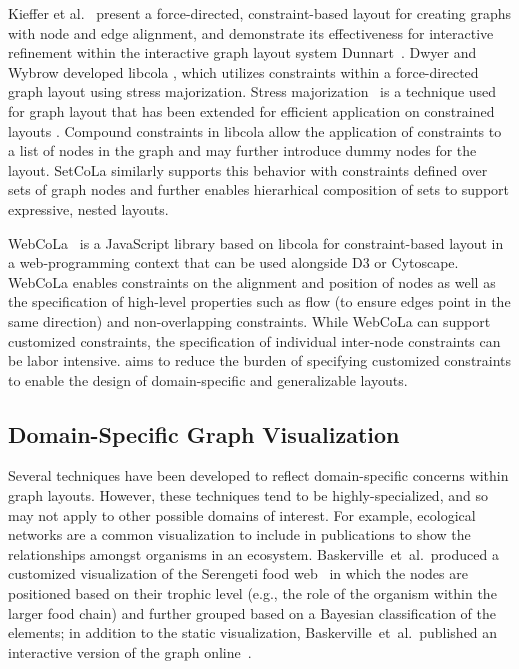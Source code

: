 Kieffer et al.~\cite{kieffer2013incremental} present a force-directed,
constraint-based layout for creating graphs with node and edge alignment, 
and demonstrate its effectiveness for interactive refinement within
the interactive graph layout system Dunnart~\cite{dwyer2008dunnart}.
Dwyer and Wybrow developed libcola \cite{libcola}, which utilizes constraints within a
force-directed graph layout \cite{dwyer2008topology} using 
stress majorization. Stress majorization~\cite{gansner2004graph} 
is a technique used for graph layout that has been extended for efficient 
application on constrained layouts \cite{dwyer2007constrained,wang2018revisiting}.
Compound constraints in libcola allow the application of constraints to a list
of nodes in the graph and may further introduce dummy nodes for the layout.
SetCoLa similarly supports this behavior with constraints defined over sets
of graph nodes and further enables hierarhical composition of sets to support
expressive, nested layouts.

WebCoLa~\cite{WebCoLa} is a JavaScript library based on libcola 
for constraint-based layout in a web-programming context that can be used alongside
D3 or Cytoscape.
WebCoLa enables constraints on the alignment and
position of nodes as well as the specification of high-level properties such as flow (to ensure
edges point in the same direction) and non-overlapping constraints.
While WebCoLa can support customized constraints,
the specification of individual inter-node constraints can be labor intensive.
\projectname aims to reduce the burden of specifying customized constraints
to enable the design of domain-specific and generalizable layouts.

\vspace{-5px}
\subsection{Domain-Specific Graph Visualization}
Several techniques have been developed to reflect domain-specific concerns
within graph layouts. However, these techniques
tend to be highly-specialized, and so may not apply to other possible
domains of interest. For example, ecological networks are a common visualization
to include in publications to show the relationships amongst organisms in
an ecosystem. Baskerville~et~al.\ produced a customized visualization of 
the Serengeti food web~\cite{baskerville2011spatial} in which the nodes
are positioned based on their trophic level (e.g., the role of the
organism within the larger food chain) and further grouped based on a
Bayesian classification of the elements;  in addition to the 
static visualization, Baskerville~et~al.\ 
published an interactive version of the graph online~\cite{baskerville2011interactive}. 

